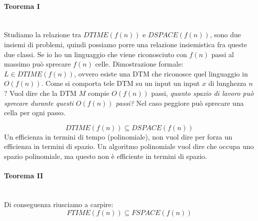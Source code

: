 \documentclass{article}
\begin{document}
\paragraph{Teorema I}\mbox{}\\
Studiamo la relazione tra $DTIME(f(n))$ e $DSPACE(f(n))$, sono due insiemi di problemi, quindi
possiamo porre una relazione insiemistica fra queste due classi. Se io ho un linguaggio
che viene riconosciuto con $f(n)$ passi al massimo può sprecare $f(n)$ celle.
\newline\newline
Dimostrazione formale: $L\in DTIME(f(n))$, ovvero esiste una DTM che riconosce quel linguaggio in
$O(f(n))$. Come si comporta tele DTM su un input un input $x$ di lunghezza $n$?
Vuol dire che la DTM $M$ compie $O(f(n))$ passi,
\textit{quanto spazio di lavoro può sprecare durante questi $O(f(n))$ passi?} Nel caso peggiore
può sprecare una cella per ogni passo.

$$DTIME(f(n))\subseteq DSPACE(f(n))$$
Un efficienza in termini di tempo (polinomiale), non vuol dire per forza un efficienza in termini
di spazio. Un algoritmo polinomiale vuol dire che occupa uno spazio polinomiale, ma questo
non è efficiente in termini di spazio.

\paragraph{Teorema II}\mbox{}\\
Di conseguenza riusciamo a carpire:
$$FTIME(f(n))\subseteq FSPACE(f(n))$$
\end{document}
